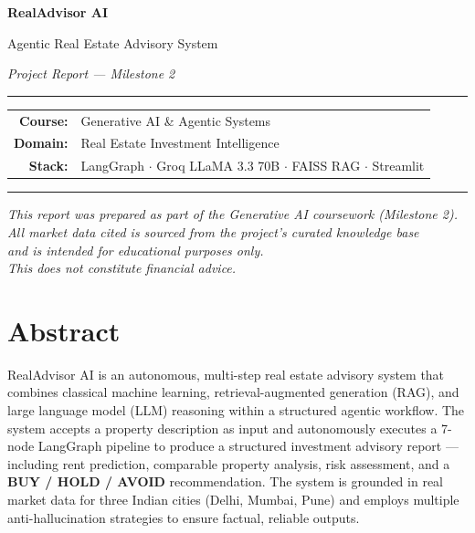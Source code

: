 \documentclass[12pt,a4paper]{article}
\begin{document}

\begin{titlepage}
  \centering
  \vspace*{2cm}

  {\Huge\bfseries\color{headerblue} RealAdvisor AI\par}
  \vspace{0.5cm}
  {\LARGE Agentic Real Estate Advisory System\par}
  \vspace{0.3cm}
  {\large\textit{Project Report --- Milestone 2}\par}

  \vspace{2cm}
  \rule{0.6\textwidth}{0.5pt}
  \vspace{1cm}

  \begin{tabular}{rl}
    \textbf{Course:} & Generative AI \& Agentic Systems \\[6pt]
    \textbf{Domain:} & Real Estate Investment Intelligence \\[6pt]
    \textbf{Stack:}  & LangGraph $\cdot$ Groq LLaMA 3.3 70B $\cdot$ FAISS RAG $\cdot$ Streamlit \\
  \end{tabular}

  \vspace{2cm}
  \rule{0.6\textwidth}{0.5pt}

  \vfill
  {\small\textit{This report was prepared as part of the Generative AI coursework (Milestone 2).\\
  All market data cited is sourced from the project's curated knowledge base\\
  and is intended for educational purposes only.\\
  This does not constitute financial advice.}}
\end{titlepage}

\tableofcontents
\newpage

\section{Abstract}

RealAdvisor AI is an autonomous, multi-step real estate advisory system that combines classical machine learning, retrieval-augmented generation (RAG), and large language model (LLM) reasoning within a structured agentic workflow. The system accepts a property description as input and autonomously executes a 7-node LangGraph pipeline to produce a structured investment advisory report --- including rent prediction, comparable property analysis, risk assessment, and a \textbf{BUY / HOLD / AVOID} recommendation. The system is grounded in real market data for three Indian cities (Delhi, Mumbai, Pune) and employs multiple anti-hallucination strategies to ensure factual, reliable outputs.
\end{document}

